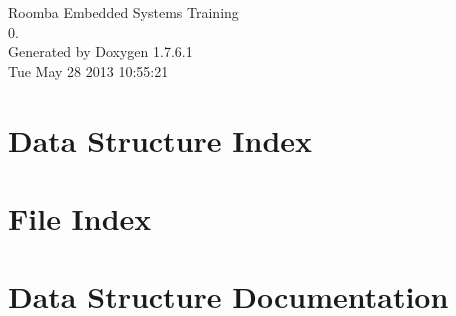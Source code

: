 \documentclass[a4paper]{book}
\begin{document}
\hypersetup{pageanchor=false,citecolor=blue}
\begin{titlepage}
\vspace*{7cm}
\begin{center}
{\Large \-Roomba \-Embedded \-Systems \-Training \\[1ex]\large 0. }\\
\vspace*{1cm}
{\large \-Generated by Doxygen 1.7.6.1}\\
\vspace*{0.5cm}
{\small Tue May 28 2013 10:55:21}\\
\end{center}
\end{titlepage}
\clearemptydoublepage
{}
\tableofcontents
\clearemptydoublepage
{}
\hypersetup{pageanchor=true,citecolor=blue}
\chapter{\-Data \-Structure \-Index}

\chapter{\-File \-Index}

\chapter{\-Data \-Structure \-Documentation}












\end{document}

